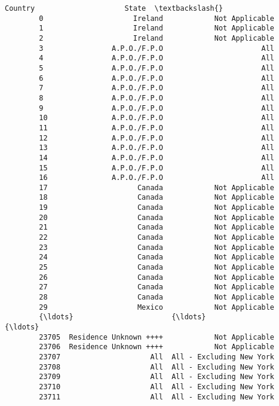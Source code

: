 \documentclass[11pt]{article}
\begin{document}
\begin{Verbatim}[commandchars=\\\{\}]
                              Country                     State  \textbackslash{}
        0                     Ireland            Not Applicable   
        1                     Ireland            Not Applicable   
        2                     Ireland            Not Applicable   
        3                A.P.O./F.P.O                       All   
        4                A.P.O./F.P.O                       All   
        5                A.P.O./F.P.O                       All   
        6                A.P.O./F.P.O                       All   
        7                A.P.O./F.P.O                       All   
        8                A.P.O./F.P.O                       All   
        9                A.P.O./F.P.O                       All   
        10               A.P.O./F.P.O                       All   
        11               A.P.O./F.P.O                       All   
        12               A.P.O./F.P.O                       All   
        13               A.P.O./F.P.O                       All   
        14               A.P.O./F.P.O                       All   
        15               A.P.O./F.P.O                       All   
        16               A.P.O./F.P.O                       All   
        17                     Canada            Not Applicable   
        18                     Canada            Not Applicable   
        19                     Canada            Not Applicable   
        20                     Canada            Not Applicable   
        21                     Canada            Not Applicable   
        22                     Canada            Not Applicable   
        23                     Canada            Not Applicable   
        24                     Canada            Not Applicable   
        25                     Canada            Not Applicable   
        26                     Canada            Not Applicable   
        27                     Canada            Not Applicable   
        28                     Canada            Not Applicable   
        29                     Mexico            Not Applicable   
        {\ldots}                       {\ldots}                       {\ldots}   
        23705  Residence Unknown ++++            Not Applicable   
        23706  Residence Unknown ++++            Not Applicable   
        23707                     All  All - Excluding New York   
        23708                     All  All - Excluding New York   
        23709                     All  All - Excluding New York   
        23710                     All  All - Excluding New York   
        23711                     All  All - Excluding New York   

\end{Verbatim}
\end{document}
